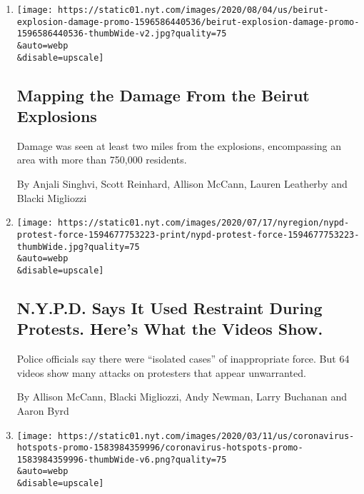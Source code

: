 \begin{enumerate}
\def\labelenumi{\arabic{enumi}.}
\item
  \href{/interactive/2020/08/04/world/middleeast/beirut-explosion-damage.html}{}

  \texttt{[image: https://static01.nyt.com/images/2020/08/04/us/beirut-explosion-damage-promo-1596586440536/beirut-explosion-damage-promo-1596586440536-thumbWide-v2.jpg?quality=75\\\&auto=webp\\\&disable=upscale]}

  \hypertarget{mapping-the-damage-from-the-beirut-explosions}{%
  \subsection{Mapping the Damage From the Beirut
  Explosions}\label{mapping-the-damage-from-the-beirut-explosions}}

  Damage was seen at least two miles from the explosions, encompassing
  an area with more than 750,000 residents.

  By Anjali Singhvi, Scott Reinhard, Allison McCann, Lauren Leatherby
  and Blacki Migliozzi
\item
  \href{/interactive/2020/07/14/nyregion/nypd-george-floyd-protests.html}{}

  \texttt{[image: https://static01.nyt.com/images/2020/07/17/nyregion/nypd-protest-force-1594677753223-print/nypd-protest-force-1594677753223-thumbWide.jpg?quality=75\\\&auto=webp\\\&disable=upscale]}

  \hypertarget{nypd-says-it-used-restraint-during-protests-heres-what-the-videos-show}{%
  \subsection{N.Y.P.D. Says It Used Restraint During Protests. Here's
  What the Videos
  Show.}\label{nypd-says-it-used-restraint-during-protests-heres-what-the-videos-show}}

  Police officials say there were ``isolated cases'' of inappropriate
  force. But 64 videos show many attacks on protesters that appear
  unwarranted.

  By Allison McCann, Blacki Migliozzi, Andy Newman, Larry Buchanan and
  Aaron Byrd
\item
  \href{/interactive/2020/world/coronavirus-maps-italy-iran-korea.html}{}

  \texttt{[image: https://static01.nyt.com/images/2020/03/11/us/coronavirus-hotspots-promo-1583984359996/coronavirus-hotspots-promo-1583984359996-thumbWide-v6.png?quality=75\\\&auto=webp\\\&disable=upscale]}


\end{enumerate}
